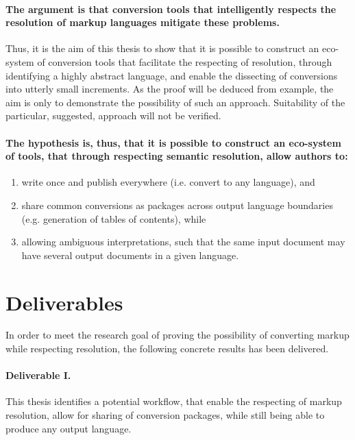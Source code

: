 \documentclass{scrreprt}
\begin{document}
\paragraph{The argument is that conversion tools that intelligently respects the resolution of markup languages mitigate these problems.} Thus, it is the aim of this thesis to show that it is possible to construct an eco-system of conversion tools that facilitate the respecting of resolution, through identifying a highly abstract language, and enable the dissecting of conversions into utterly small increments. As the proof will be deduced from example, the aim is only to demonstrate the possibility of such an approach. Suitability of the particular, suggested, approach will not be verified.

\paragraph{The hypothesis is, thus, that it is possible to construct an eco-system of tools, that through respecting semantic resolution, allow authors to:}

\begin{enumerate}
\item write once and publish everywhere (i.e. convert to any language), and
\item share common conversions as packages across output language boundaries (e.g. generation of tables of contents), while
\item allowing ambiguous interpretations, such that the same input document may have several output documents in a given language.
\end{enumerate}



\section{Deliverables}
In order to meet the research goal of proving the possibility of converting markup while respecting resolution, the following concrete results has been delivered.

\paragraph{Deliverable I.} This thesis identifies a potential workflow, that enable the respecting of markup resolution, allow for sharing of conversion packages, while still being able to produce any output language.
\end{document}
